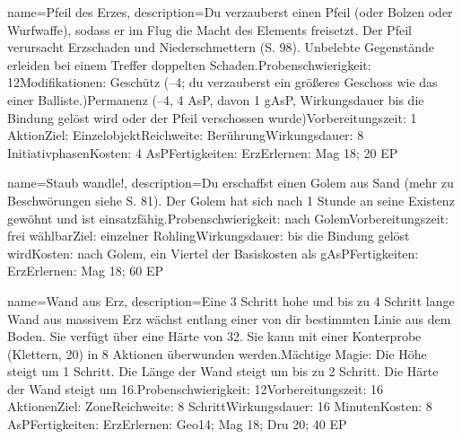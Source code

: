 {
    name={Pfeil des Erzes},
    description={Du verzauberst einen Pfeil (oder Bolzen oder Wurfwaffe), sodass er im Flug die Macht des Elements freisetzt. Der Pfeil verursacht Erzschaden und Niederschmettern (S. 98). Unbelebte Gegenstände erleiden bei einem Treffer doppelten Schaden.\newline Probenschwierigkeit: 12\newline Modifikationen: Geschütz (–4; du verzauberst ein größeres Geschoss wie das einer Balliste.)\newline Permanenz (–4, 4 AsP, davon 1 gAsP, Wirkungsdauer bis die Bindung gelöst wird oder der Pfeil verschossen wurde)\newline Vorbereitungszeit: 1 Aktion\newline Ziel: Einzelobjekt\newline Reichweite: Berührung\newline Wirkungsdauer: 8 Initiativphasen\newline Kosten: 4 AsP\newline Fertigkeiten: Erz\newline Erlernen: Mag 18; 20 EP}
}


{
    name={Staub wandle!},
    description={Du erschaffst einen Golem aus Sand (mehr zu Beschwörungen siehe S. 81). Der Golem hat sich nach 1 Stunde an seine Existenz gewöhnt und ist einsatzfähig.\newline Probenschwierigkeit: nach Golem\newline Vorbereitungszeit: frei wählbar\newline Ziel: einzelner Rohling\newline Wirkungsdauer: bis die Bindung gelöst wird\newline Kosten: nach Golem, ein Viertel der Basiskosten als gAsP\newline Fertigkeiten: Erz\newline Erlernen: Mag 18; 60 EP}
}


{
    name={Wand aus Erz},
    description={Eine 3 Schritt hohe und bis zu 4 Schritt lange Wand aus massivem Erz wächst entlang einer von dir bestimmten Linie aus dem Boden. Sie verfügt über eine Härte von 32. Sie kann mit einer Konterprobe (Klettern, 20) in 8 Aktionen überwunden werden.\newline Mächtige Magie: Die Höhe steigt um 1 Schritt. Die Länge der Wand steigt um bis zu 2 Schritt. Die Härte der Wand steigt um 16.\newline Probenschwierigkeit: 12\newline Vorbereitungszeit: 16 Aktionen\newline Ziel: Zone\newline Reichweite: 8 Schritt\newline Wirkungsdauer: 16 Minuten\newline Kosten: 8 AsP\newline Fertigkeiten: Erz\newline Erlernen: Geo14; Mag 18; Dru 20; 40 EP}
}


